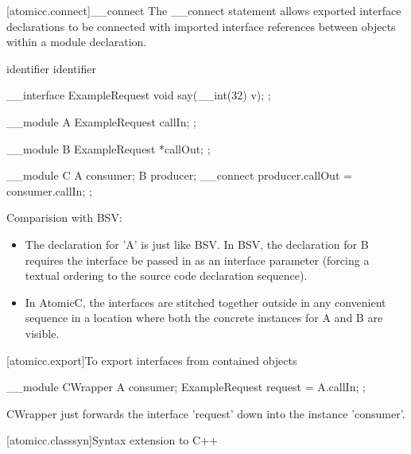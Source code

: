 [atomicc.connect]{__connect}
The __connect statement allows exported interface declarations to be connected
with imported interface references between objects within a module declaration.

\begin{bnf}
\br
     identifier \terminal{=} identifier \terminal{;}
\end{bnf}

\begin{example}
\begin{codeblock}
     __interface ExampleRequest {
         void say(__int(32) v);
     };

     __module A {
          ExampleRequest callIn;
     };

     __module B {
         ExampleRequest *callOut;
     };

     __module C {
         A consumer;
         B producer;
         __connect producer.callOut = consumer.callIn;
     };
\end{codeblock}
\end{example}

Comparision with BSV:
\begin{itemize}
\item The declaration for 'A' is just like BSV.
In BSV, the declaration for B requires the interface be passed in as
an interface parameter (forcing a textual ordering to the source code
declaration sequence).
\item In AtomicC, the interfaces are stitched together outside in any
convenient sequence in a location where both the concrete instances
for A and B are visible.
\end{itemize}

[atomicc.export]{To export interfaces from contained objects}

\begin{example}
\begin{codeblock}
     __module CWrapper {
         A consumer;
         ExampleRequest request = A.callIn;
      };
\end{codeblock}
\end{example}

CWrapper just forwards the interface 'request' down into the instance 'consumer'.

[atomicc.classsyn]{Syntax extension to C++}
\begin{bnf}
\br
     \br
     \br
\end{bnf}

